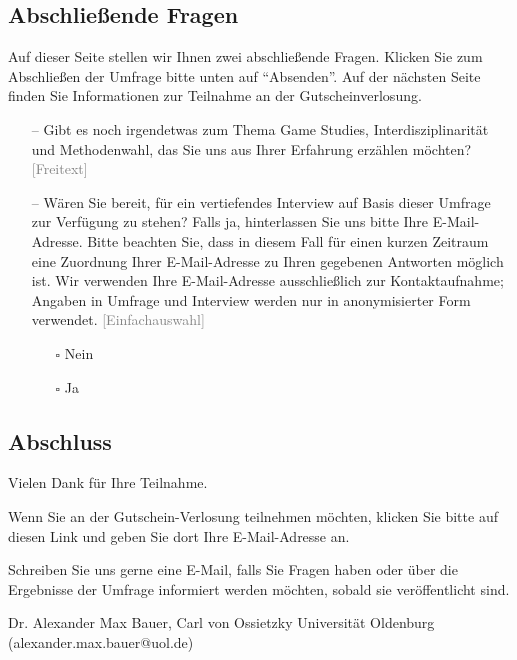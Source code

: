 \documentclass{scrartcl}
\begin{document}
\subsection*{Abschließende Fragen}
Auf dieser Seite stellen wir Ihnen zwei abschließende Fragen.
Klicken Sie zum Abschließen der Umfrage bitte unten auf \enquote{Absenden}.
Auf der nächsten Seite finden Sie Informationen zur Teilnahme an der Gutscheinverlosung.

\begin{itemize}
   \item[--] Gibt es noch irgendetwas zum Thema Game Studies, Interdisziplinarität und Methodenwahl, das Sie uns aus Ihrer Erfahrung erzählen möchten? \textcolor{gray}{\textsf{[Freitext]}}
   \item[--] Wären Sie bereit, für ein vertiefendes Interview auf Basis dieser Umfrage zur Verfügung zu stehen? Falls ja, hinterlassen Sie uns bitte Ihre E-Mail-Adresse. Bitte beachten Sie, dass in diesem Fall für einen kurzen Zeitraum eine Zuordnung Ihrer E-Mail-Adresse zu Ihren gegebenen Antworten möglich ist. Wir verwenden Ihre E-Mail-Adresse ausschließlich zur Kontaktaufnahme; Angaben in Umfrage und Interview werden nur in anonymisierter Form verwendet. \textcolor{gray}{\textsf{[Einfachauswahl]}}
   \begin{itemize}
      \item[$\square$] Nein
      \item[$\square$] Ja
   \end{itemize}
\end{itemize}


\subsection*{Abschluss}
Vielen Dank für Ihre Teilnahme.

Wenn Sie an der Gutschein-Verlosung teilnehmen möchten, klicken Sie bitte auf diesen Link und geben Sie dort Ihre E-Mail-Adresse an.

Schreiben Sie uns gerne eine E-Mail, falls Sie Fragen haben oder über die Ergebnisse der Umfrage informiert werden möchten, sobald sie veröffentlicht sind.

\vspace{1em}
\noindent Dr. Alexander Max Bauer, Carl von Ossietzky Universität Oldenburg\\
(alexander.max.bauer@uol.de)
\end{document}
